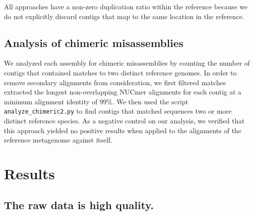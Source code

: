 \documentclass[10pt,a4paper,twocolumn]{article}
\begin{document}

All approaches have a non-zero duplication ratio within the reference
because we do not explicitly discard contigs that map to the same
location in the reference.

\subsection*{Analysis of chimeric misassemblies}


We analyzed each assembly for chimeric misassemblies by counting the
number of contigs that contained matches to two distinct reference
genomes.  In order to remove secondary alignments from consideration,
we first filtered matches extracted the longest non-overlapping NUCmer
alignments for each contig at a minimum alignment identity of 99\%.
We then used the script {\tt analyze\_chimeric2.py} to find contigs
that matched sequences two or more distinct reference species.  As a
negative control on our analysis, we verified that this approach
yielded no positive results when applied to the alignments of the
reference metagenome against itself.




\section*{Results}

\subsection*{The raw data is high quality.}
\end{document}
